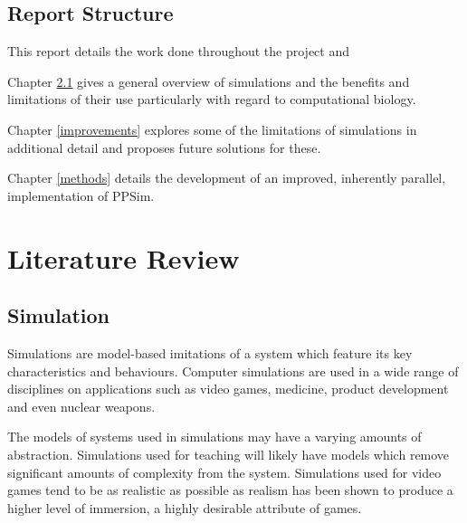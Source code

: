 \documentclass{UoYCSproject}
\begin{document}
\section{Report Structure}
This report details the work done throughout the project and 

Chapter \ref{simulation} gives a general overview of simulations and the benefits and limitations of their use particularly with regard to computational biology.

Chapter \ref{improvements} explores some of the limitations of simulations in additional detail and proposes future solutions for these.

Chapter \ref{methods} details the development of an improved, inherently parallel, implementation of PPSim.

\chapter{Literature Review}
%

\section{Simulation}
\label{simulation}
Simulations are model-based imitations of a system which feature its key characteristics and behaviours. Computer simulations are used in a wide range of disciplines on applications such as video games, medicine, product development and even nuclear weapons.

The models of systems used in simulations may have a varying amounts of abstraction. Simulations used for teaching will likely have models which remove significant amounts of complexity from the system. Simulations used for video games tend to be as realistic as possible as realism has been shown to produce a higher level of immersion\cite{realism_immersion}, a highly desirable attribute of games.%
\end{document}
